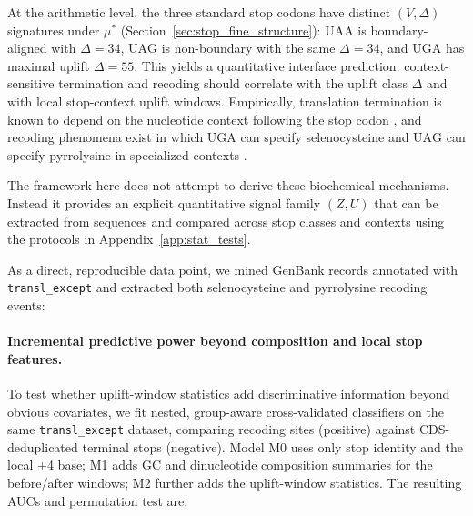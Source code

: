 At the arithmetic level, the three standard stop codons have distinct $(V,\Delta)$ signatures under $\mu^\ast$ (Section~\ref{sec:stop_fine_structure}):
$\mathrm{UAA}$ is boundary-aligned with $\Delta=34$, $\mathrm{UAG}$ is non-boundary with the same $\Delta=34$, and $\mathrm{UGA}$ has maximal uplift $\Delta=55$.
This yields a quantitative interface prediction: context-sensitive termination and recoding should correlate with the uplift class $\Delta$ and with local stop-context uplift windows.
Empirically, translation termination is known to depend on the nucleotide context following the stop codon \cite{McCaughanBrownDalphinBerryTate1995}, and recoding phenomena exist in which $\mathrm{UGA}$ can specify selenocysteine and $\mathrm{UAG}$ can specify pyrrolysine in specialized contexts \cite{HatfieldGladyshev2002,SrinivasanJamesKrzycki2002}.

The framework here does not attempt to derive these biochemical mechanisms.
Instead it provides an explicit quantitative signal family $(Z,U)$ that can be extracted from sequences and compared across stop classes and contexts using the protocols in Appendix~\ref{app:stat_tests}.
\medskip

\noindent As a direct, reproducible data point, we mined GenBank records annotated with \texttt{transl\_except} and extracted both selenocysteine and pyrrolysine recoding events:
\cite{NCBIGenBank}




\begin{sloppypar}

\end{sloppypar}
\begin{sloppypar}

\end{sloppypar}

\paragraph{Incremental predictive power beyond composition and local stop features.}
To test whether uplift-window statistics add discriminative information beyond obvious covariates, we fit nested, group-aware cross-validated classifiers on the same \texttt{transl\_except} dataset, comparing recoding sites (positive) against CDS-deduplicated terminal stops (negative).
Model M0 uses only stop identity and the local +4 base; M1 adds GC and dinucleotide composition summaries for the before/after windows; M2 further adds the uplift-window statistics.
The resulting AUCs and permutation test are:



